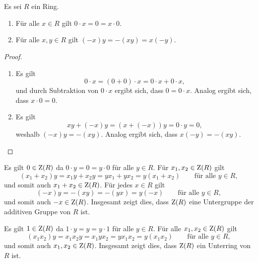 \section{}





\subsection{}

\begin{lemma}
  Es sei $R$ ein Ring.
  \begin{enumerate}
    \item
      Für alle $x \in R$ gilt $0 \cdot x = 0 = x \cdot 0$.
    \item
      Für alle $x, y \in R$ gilt $(-x)y = -(xy) = x(-y)$.
  \end{enumerate}
\end{lemma}

\begin{proof}
  \begin{enumerate}
    \item
      Es gilt
      \[
          0 \cdot x
        = (0 + 0) \cdot x
        = 0 \cdot x + 0 \cdot x,
      \]
      und durch Subtraktion von $0 \cdot x$ ergibt sich, dass $0 = 0 \cdot x$.
      Analog ergibt sich, dass $x \cdot 0 = 0$.
    \item
      Es gilt
      \[
          xy + (-x)y
        = (x + (-x))y
        = 0 \cdot y
        = 0,
      \]
      weshalb $(-x)y = -(xy)$.
      Analog ergibt sich, dass $x(-y) = -(xy)$.
    \qedhere
  \end{enumerate}
\end{proof}

Es gilt $0 \in \operatorname{Z}(R)$ da $0 \cdot y = 0 = y \cdot 0$ für alle $y \in R$.
Für $x_1, x_2 \in \operatorname{Z}(R)$ gilt
\[
    (x_1 + x_2) y
  = x_1 y + x_2 y
  = y x_1 + y x_2
  = y (x_1 + x_2) 
  \qquad
  \text{für alle $y \in R$},
\]
und somit auch $x_1 + x_2 \in \operatorname{Z}(R)$.
Für jedes $x \in R$ gilt
\[
    (-x) y
  = -(xy)
  = -(yx)
  = y (-x)
  \qquad
  \text{für alle $y \in R$},
\]
und somit auch $-x \in \operatorname{Z}(R)$.
Insgesamt zeigt dies, dass $\operatorname{Z}(R)$ eine Untergruppe der additiven Gruppe von $R$ ist.

Es gilt $1 \in \operatorname{Z}(R)$ da $1 \cdot y = y = y \cdot 1$ für alle $y \in R$.
Für alle $x_1, x_2 \in \operatorname{Z}(R)$ gilt
\[
    (x_1 x_2) y
  = x_1 x_2 y
  = x_1 y x_2
  = y x_1 x_2
  = y (x_1 x_2)
  \qquad
  \text{für alle $y \in R$},
\]
und somit auch $x_1, x_2 \in \operatorname{Z}(R)$.
Insgesamt zeigt dies, dass $\operatorname{Z}(R)$ ein Unterring von $R$ ist.

